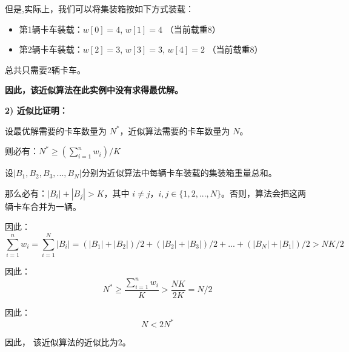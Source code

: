 \documentclass[UTF8,12pt,a4paper]{ctexart}
\begin{document}
\begin{enumerate}[1.]
	但是,实际上，我们可以将集装箱按如下方式装载：
	\begin{itemize}
		\item 第1辆卡车装载：$w[0] = 4$, $w[1] = 4$ （当前载重8）
		\item 第2辆卡车装载：$w[2] = 3$, $w[3] = 3$, $w[4] = 2$ （当前载重8）
	\end{itemize}
	总共只需要2辆卡车。
	
	\textbf{因此，该近似算法在此实例中没有求得最优解。}

	\textbf{2) 近似比证明：}

	设最优解需要的卡车数量为 $N^{*}$，近似算法需要的卡车数量为 $N$。

	则必有：$N^{*} \geq (\sum_{i=1}^{n} w_i)/K$
	
	设$|B_1, B_2, B_3, ..., B_N|$分别为近似算法中每辆卡车装载的集装箱重量总和。

	那么必有：$|B_i| + |B_j| > K$，其中 $i \neq j$，$i,j \in \{1,2,...,N\}$。否则，算法会把这两辆卡车合并为一辆。

	因此：$$\sum_{i=1}^{n}w_i = \sum_{i=1}^{N} |B_i|  = (|B_1| + |B_2|)/2 + (|B_2| + |B_3|)/2 + ... + (|B_N| + |B_1|) /2 > NK/2$$

	因此：$$N^{*} \geq \frac{\sum_{i=1}^{n}w_i}{K} > \frac{NK}{2K} = N/2$$

	因此：$$N < 2N^{*}$$

	因此， 该近似算法的近似比为2。

\end{enumerate}
\end{document}
